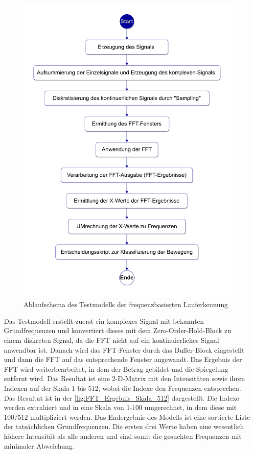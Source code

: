 \begin{figure}[htpb]
	\centering
	\includegraphics[width=0.7\linewidth]{Bilder/Frequenzermittlung_Ablaufschema2_pdf.pdf}
	\caption{Ablaufschema des Testmodells der frequenzbasierten Lauferkennung}
	\label{fig:Lauferkennung_FFT_Ablaufschema_Testmodell}
\end{figure}
Das Testmodell erstellt zuerst ein komplexes Signal mit bekannten Grundfrequenzen und konvertiert dieses mit dem \glqq Zero-Order-Hold\grqq{}-Block zu einem diskreten Signal, da die FFT nicht auf ein kontinuierliches Signal anwendbar ist. Danach wird das FFT-Fenster durch das \glqq Buffer\grqq{}-Block eingestellt und dann die FFT auf das entsprechende Fenster angewandt. Das Ergebnis der FFT wird weiterbearbeitet, in dem der Betrag gebildet und die Spiegelung entfernt wird. Das Resultat ist eine 2-D-Matrix mit den Intensitäten sowie ihren Indexen auf der Skala $1$ bis $512$, wobei die Indexe den Frequenzen entsprechen. Das Resultat ist in der \autoref{fig:FFT_Ergebnis_Skala_512} dargestellt. Die Indexe werden extrahiert und in eine Skala von 1-100 umgerechnet, in dem diese mit $100/512$ multipliziert werden.
Das Endergebnis des Modells ist eine sortierte Liste der tatsächlichen Grundfrequenzen. Die ersten drei Werte haben eine wesentlich höhere Intensität als alle anderen und sind somit die gesuchten Frequenzen mit minimaler Abweichung.

